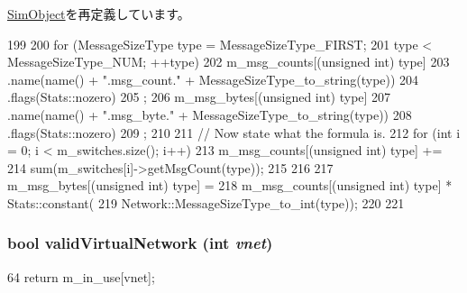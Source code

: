 \hyperlink{classSimObject_a4dc637449366fcdfc4e764cdf12d9b11}{SimObject}を再定義しています。


\begin{DoxyCode}
199 {
200     for (MessageSizeType type = MessageSizeType_FIRST;
201          type < MessageSizeType_NUM; ++type) {
202         m_msg_counts[(unsigned int) type]
203             .name(name() + ".msg_count." + MessageSizeType_to_string(type))
204             .flags(Stats::nozero)
205             ;
206         m_msg_bytes[(unsigned int) type]
207             .name(name() + ".msg_byte." + MessageSizeType_to_string(type))
208             .flags(Stats::nozero)
209             ;
210 
211         // Now state what the formula is.
212         for (int i = 0; i < m_switches.size(); i++) {
213             m_msg_counts[(unsigned int) type] +=
214                 sum(m_switches[i]->getMsgCount(type));
215         }
216 
217         m_msg_bytes[(unsigned int) type] =
218             m_msg_counts[(unsigned int) type] * Stats::constant(
219                     Network::MessageSizeType_to_int(type));
220     }
221 }
\end{DoxyCode}
\hypertarget{classSimpleNetwork_adf94d17da461ce5960923fec76cf70b5}{
\subsubsection[{validVirtualNetwork}]{\setlength{\rightskip}{0pt plus 5cm}bool validVirtualNetwork (int {\em vnet})}}
\label{classSimpleNetwork_adf94d17da461ce5960923fec76cf70b5}



\begin{DoxyCode}
64 { return m_in_use[vnet]; }
\end{DoxyCode}


